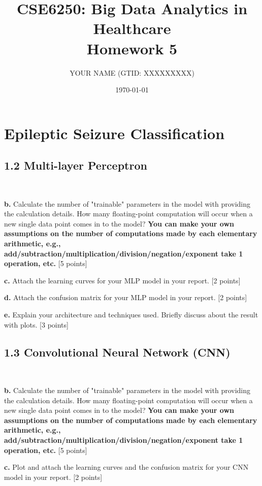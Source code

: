 \documentclass[12pt]{article}
\title{CSE6250: Big Data Analytics in Healthcare \\ Homework 5}
\author{YOUR NAME (GTID: XXXXXXXXX)}
\date{\today}
\begin{document}
\maketitle

\section{Epileptic Seizure Classification}

\subsection*{1.2 Multi-layer Perceptron}
~

\textbf{b.} Calculate the number of "trainable" parameters in the model with providing the calculation details. How many floating-point computation will occur when a new single data point comes in to the model?  \textbf{You can make your own assumptions on the number of computations made by each elementary arithmetic, e.g., add/subtraction/multiplication/division/negation/exponent take 1 operation, etc.} [5 points]

\bigskip

\textbf{c.} Attach the learning curves for your MLP model in your report. [2 points]

\bigskip

\textbf{d.} Attach the confusion matrix for your MLP model in your report. [2 points]

\bigskip
\textbf{e.} Explain your architecture and techniques used. Briefly discuss about the result with plots. [3 points]

\subsection*{1.3 Convolutional Neural Network (CNN)}
~

\textbf{b.} Calculate the number of "trainable" parameters in the model with providing the calculation details. How many floating-point computation will occur when a new single data point comes in to the model?  \textbf{You can make your own assumptions on the number of computations made by each elementary arithmetic, e.g., add/subtraction/multiplication/division/negation/exponent take 1 operation, etc.} [5 points]

\bigskip

\textbf{c.} Plot and attach the learning curves and the confusion matrix for your CNN model in your report. [2 points]
\end{document}
